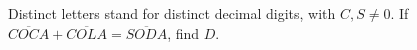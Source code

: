 Distinct letters stand for distinct decimal digits, with $C,S\ne0$. If $\overline{COCA}+\overline{COLA}=\overline{SODA}$, find $D$.
